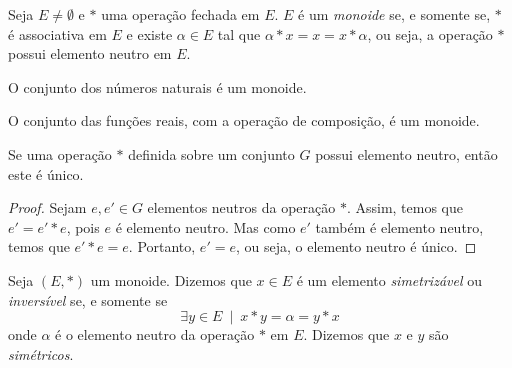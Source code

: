 \begin{df}
Seja $E\neq\emptyset$ e $*$ uma operação fechada em $E$. $E$ é um \emph{monoide} se, e somente se, $*$ é associativa em $E$ e existe $\alpha \in E$ tal que $\alpha * x= x = x* \alpha$, ou seja, a operação $*$ possui elemento neutro em $E$.
\end{df}
\begin{exemplo}
O conjunto dos números naturais é um monoide. \par 
O conjunto das funções reais, com a operação de composição, é um monoide.
\end{exemplo}
\begin{prop}
Se uma operação $*$ definida sobre um conjunto $G$ possui elemento neutro, então este é único.
\begin{proof}
Sejam $e,e'\in G$ elementos neutros da operação $*$. Assim, temos que $e'=e'*e$, pois $e$ é elemento neutro. Mas como $e'$ também é elemento neutro, temos que $e'*e=e$. Portanto, $e'=e$, ou seja, o elemento neutro é único.
\end{proof}\end{prop}

\begin{df}
Seja $(E,*)$ um monoide. Dizemos que $x\in E$ é um elemento \emph{simetrizável} ou \emph{inversível} se, e somente se
\[\exists y \in E \:\mid\: x*y=\alpha=y*x \]
onde $\alpha$ é o elemento neutro da operação $*$ em $E$. Dizemos que $x$ e $y$ são \emph{simétricos}.
\end{df}

